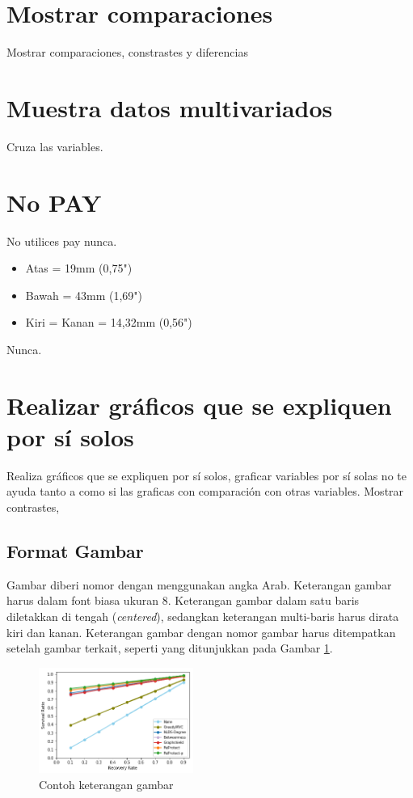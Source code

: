 \documentclass[conference, a4paper]{IEEEtran_ID}
\begin{document}
\section{Mostrar comparaciones}

Mostrar comparaciones, constrastes y diferencias

\section{Muestra datos multivariados}

Cruza las variables. 

\section{No PAY}

No utilices pay nunca. 

\begin{itemize}
	\item Atas = 19mm (0,75")
	\item Bawah = 43mm (1,69")
	\item Kiri = Kanan = 14,32mm (0,56")
\end{itemize}
	
Nunca. 

\section{Realizar gráficos que se expliquen por sí solos}


Realiza gráficos que se expliquen por sí solos, graficar variables por sí solas no te ayuda tanto a como si las graficas con comparación con otras variables. Mostrar contrastes, 


\subsection{Format Gambar}
	
	Gambar diberi nomor dengan menggunakan angka Arab. Keterangan gambar harus dalam font biasa ukuran 8. Keterangan gambar dalam satu baris diletakkan di tengah (\textit{centered}), sedangkan keterangan multi-baris harus dirata kiri dan kanan. Keterangan gambar dengan nomor gambar harus ditempatkan setelah gambar terkait, seperti yang ditunjukkan pada Gambar \ref{fig_sample}.

	\begin{figure}[htbp]
		\centerline{\includegraphics[width=0.45\textwidth]{figure.png}}
		\caption{Contoh keterangan gambar}
		\label{fig_sample}
	\end{figure}
\end{document}

